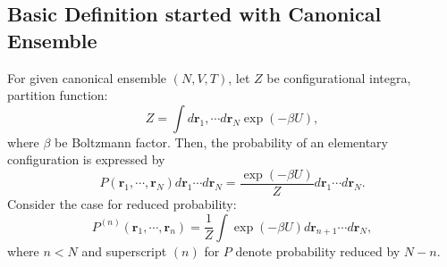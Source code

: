 \message{ !name(brief_Brownian_dynamics.tex)}\documentclass[10pt, a4paper]{report}
\begin{document}
\begin{appendices}
  \subsection{Basic Definition started with Canonical Ensemble}
  For given canonical ensemble $(N, V, T)$, let $Z$ be configurational integra, partition function:
  \begin{equation}
    Z = \int d\mathbf{r}_1,\cdots d\mathbf{r}_N \exp\left(-\beta U\right),
  \end{equation}
  where $\beta$ be Boltzmann factor. Then, the probability of an elementary configuration is expressed by
  \begin{equation}
    P(\mathbf{r}_1, \cdots, \mathbf{r}_N)d\mathbf{r}_1\cdots d\mathbf{r}_N = \frac{\exp\left(-\beta U\right)}{Z}d\mathbf{r}_1\cdots d\mathbf{r}_N.
  \end{equation}
  Consider the case for reduced probability:
  \begin{equation}
    P^{(n)}(\mathbf{r}_1,\cdots,\mathbf{r}_n)=\frac{1}{Z}\int\exp\left(-\beta U\right)d\mathbf{r}_{n+1}\cdots d\mathbf{r}_N,
  \end{equation}
  where $n<N$ and superscript $(n)$ for $P$ denote probability reduced by $N-n$.

  
\end{appendices}

\printbibliography
\end{document}
